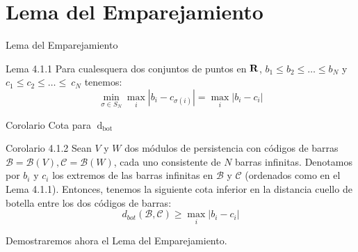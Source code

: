 \documentclass{beamer}
\newcommand{\calB}{{\mathcal{B}}}
\newcommand{\calC}{{\mathcal{C}}}
\def\dbot{\operatorname{d}_{\operatorname{bot}}}
\def\R\re
\def \R{{\bf R}}
\def \re{{\mathbb R}}
\begin{document}
\section{Lema del Emparejamiento}
 
	\begin{frame}{Lema del Emparejamiento}
	    
	\begin{block}{Lema 4.1.1}
	Para cualesquera dos conjuntos de puntos en $\R$, $b_1 \leq b_2 \leq \ldots \leq b_N$ y $c_1 \leq c_2 \leq \ldots \leq~c_N$ tenemos:
 \pause
 \[\min_{\sigma\in S_N} \max_i |b_i - c_{\sigma(i)}| = \max_i |b_i - c_i|\]
	
\end{block}
\end{frame}

\begin{frame}{Corolario Cota para \(\dbot\)}
\begin{block}{Corolario 4.1.2}
		Sean $V$ y $W$ dos módulos de persistencia con códigos de barras $\calB = \calB (V), \calC = \calB (W)$, cada uno consistente de $N$ barras infinitas. Denotamos por $b_i \text{ y } c_i $ los extremos de las barras infinitas en $\calB$ y $\calC$ (ordenados como en el Lema 4.1.1). Entonces, tenemos la siguiente cota inferior en la distancia cuello de botella entre los dos códigos de barras:
  \[d_{bot} ( \calB, \calC ) \geq \max_i | b_i - c_i |\]
\end{block}
\pause
Demostraremos ahora el Lema del Emparejamiento.
\end{frame}
\end{document}
